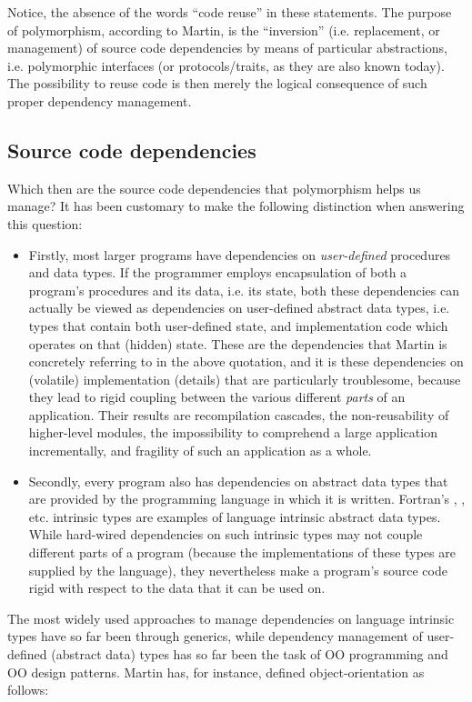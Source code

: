 \documentclass[11pt,oneside]{article}
\newcommand{\code}[1]{{\selectfont\ttfamily{#1}}}
\begin{document}
Notice, the absence of the words ``code reuse'' in these statements.
The purpose of polymorphism, according to Martin, is the ``inversion''
(i.e. replacement, or management) of source code dependencies by means
of particular abstractions, i.e. polymorphic interfaces (or
protocols/traits, as they are also known today). The possibility to
reuse code is then merely the logical consequence of such proper
dependency management.

\subsection{Source code dependencies}

Which then are the source code dependencies that polymorphism helps us
manage? It has been customary to make the following distinction when
answering this question:
\begin{itemize}
\item
 Firstly, most larger programs have dependencies on
 \emph{user-defined} procedures and data types. If the programmer
 employs encapsulation of both a program's procedures and its data,
 i.e. its state, both these dependencies can actually be viewed as
 dependencies on user-defined abstract data types, i.e. types that
 contain both user-defined state, and implementation code which
 operates on that (hidden) state. These are the dependencies that
 Martin is concretely referring to in the above quotation, and it is
 these dependencies on (volatile) implementation (details) that are
 particularly troublesome, because they lead to rigid coupling between
 the various different \emph{parts} of an application. Their results
 are recompilation cascades, the non-reusability of higher-level
 modules, the impossibility to comprehend a large application
 incrementally, and fragility of such an application as a whole.
\item
 Secondly, every program also has dependencies on abstract data types
 that are provided by the programming language in which it is written.
 Fortran's \code{integer}, \code{real}, etc. intrinsic types are
 examples of language intrinsic abstract data types. While hard-wired
 dependencies on such intrinsic types may not couple different parts
 of a program (because the implementations of these types are supplied
 by the language), they nevertheless make a program's source code
 rigid with respect to the data that it can be used on.
\end{itemize}

The most widely used approaches to manage dependencies on language
intrinsic types have so far been through generics, while dependency
management of user-defined (abstract data) types has so far been the
task of OO programming and OO design patterns. Martin has, for
instance, defined object-orientation as follows:
\end{document}
